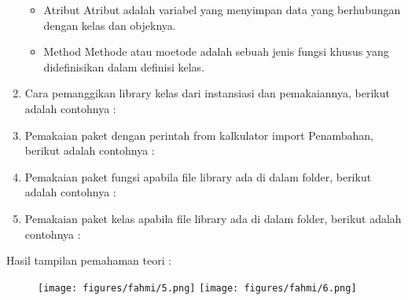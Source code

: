 \begin{enumerate}
\begin{itemize}
		\item Atribut
		Atribut adalah variabel yang menyimpan data yang berhubungan dengan kelas dan objeknya.
		
		
		\item Method
		Methode atau moetode adalah sebuah jenis fungsi khusus yang didefinisikan dalam definisi kelas.
		
		
	\end{itemize}
	
	
	\item Cara pemanggikan library kelas dari instansiasi dan pemakaiannya, berikut adalah contohnya :
	
	
	\item Pemakaian paket dengan perintah from kalkulator import Penambahan, berikut adalah contohnya :
	
	
	\item Pemakaian paket fungsi apabila file library ada di dalam folder, berikut adalah contohnya :
	
	
	\item Pemakaian paket kelas apabila file library ada di dalam folder, berikut adalah contohnya :
	
	
\end{enumerate}

Hasil tampilan pemahaman teori :
\begin{figure}[h]
	\texttt{[image: figures/fahmi/5.png]}
	\texttt{[image: figures/fahmi/6.png]}
	\centering
\end{figure}


\newpage
